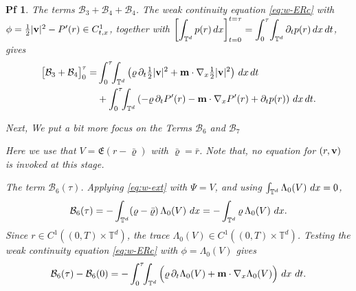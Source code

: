 \documentclass[10pt,a4paper]{amsart}
\newtheorem{pf}{Pf}
\newcommand{\Gradx}{\nabla_x}
\newcommand{\Lambdaz}{\Lambda_0}
\newcommand{\T}{\mathbb{T}}
\newcommand{\dt}{{\,\rm d} t }
\newcommand{\dx}{{\,\rm d} {x}}
\newcommand{\lr}[1]{\left( #1 \right)}
\newcommand{\vc}[1]{{\bf #1}}
\newcommand{\vm}{\vc{m}}
\newcommand{\vr}{\varrho}
\newcommand{\vv}{\vc{v}}
\begin{document}
\begin{pf}
		\noindent\emph{The terms $\mathcal B_3+\mathcal B_4+\mathcal B_4$.} The weak continuity equation \eqref{eq:w-ERc} with $\phi=\tfrac12|\vv|^2-P'(r)\in C^1_{t,x}$, together with $\displaystyle \left[\int_{\T^d} p(r) \dx  \right]_{t=0}^{t=\tau}=\int_0^\tau\!\int_{\T^d}\partial_t p(r) \dx \dt$, gives
		\begin{equation}\label{B34}
			\begin{aligned}
			\big[\mathcal B_3+\mathcal B_4\big]_0^\tau
			=&\int_0^\tau\!\!\int_{\mathbb T^d}\lr{\vr\,\partial_t\tfrac12|\vv|^2+\vm\cdot\Gradx\tfrac12|\vv|^2}\dx\dt \\
			&+\int_0^\tau\!\!\int_{\mathbb T^d}\lr{-\vr\,\partial_tP'(r)-\vm\cdot\Gradx P'(r)+\partial_tp(r)}\dx\dt .
		\end{aligned}
		\end{equation}
		
	
		Next, We put a bit more focus on the Terms $\mathcal{B}_6$ and $\mathcal{B}_7$

		
		Here we use that $V=\mathfrak{E}(r-\bar\vr)$ with $\bar\vr=\bar r$. Note that, no equation for $(r,\vv)$ is invoked at this stage. 
		

\emph{The term $\mathcal B_6(\tau)$.} Applying \eqref{eq:w-ext} with $\Psi=V$, and using
$\int_{\mathbb T^d}\Lambdaz(V)\,\dx=0$,
\begin{equation*}
	\mathcal B_6(\tau) = -\int_{\mathbb T^d}(\vr-\bar\vr)\,\Lambdaz(V)\,\dx
	= -\int_{\mathbb T^d}\vr\,\Lambdaz(V)\,\dx .
\end{equation*}
Since $r\in C^1((0,T)\times\mathbb T^d)$, the trace $\Lambdaz(V)\in C^1((0,T)\times\mathbb T^d)$.
Testing the weak continuity equation \eqref{eq:w-ERc} with $\phi=\Lambdaz(V)$ gives
\begin{equation}\label{B6-dt}
	\mathcal B_6(\tau)-\mathcal B_6(0)
	= -\int_0^\tau\!\!\int_{\mathbb T^d}\Big(\vr\,\partial_t\Lambdaz(V)
	+ \vm\cdot\Gradx\Lambdaz(V)\Big)\,\dx\,\dt .
\end{equation}


\end{pf}
\end{document}
